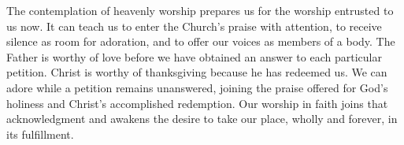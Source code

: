 The contemplation of heavenly worship prepares us for the worship entrusted to us now. It can teach us to enter the Church's praise with attention, to receive silence as room for adoration, and to offer our voices as members of a body. The Father is worthy of love before we have obtained an answer to each particular petition. Christ is worthy of thanksgiving because he has redeemed us. We can adore while a petition remains unanswered, joining the praise offered for God's holiness and Christ's accomplished redemption. Our worship in faith joins that acknowledgment and awakens the desire to take our place, wholly and forever, in its fulfillment.

